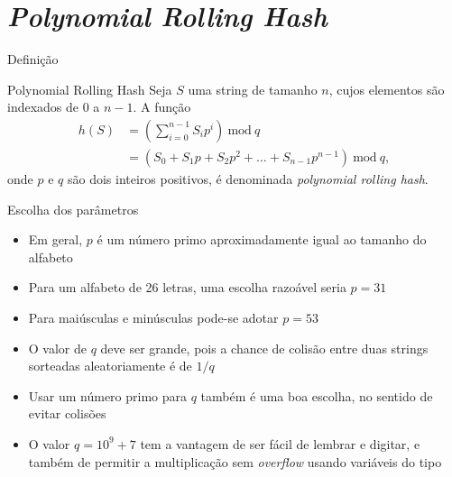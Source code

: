\section{{\it Polynomial Rolling Hash}}

\begin{frame}[fragile]{Definição}

    \begin{block}{Polynomial Rolling Hash}
    Seja $S$ uma string de tamanho $n$, cujos elementos são indexados de 0 a $n - 1$. A função 
    \begin{align*}
        h(S) &= \left(\sum_{i=0}^{n - 1} S_ip^i\right)\ \mbox{mod}\ q \\
        &= \left(S_0 + S_1p + S_2p^2 + \ldots + S_{n-1}p^{n-1}\right)\ \mbox{mod}\ q,
    \end{align*}
    onde $p$ e $q$ são dois inteiros positivos, é denominada \textit{polynomial rolling hash}.
    \end{block}

\end{frame}

\begin{frame}[fragile]{Escolha dos parâmetros}

    \begin{itemize}
        \item Em geral, $p$ é um número primo aproximadamente igual ao tamanho do alfabeto
        \item Para um alfabeto de 26 letras, uma escolha razoável seria $p = 31$
        \item Para maiúsculas e minúsculas pode-se adotar $p = 53$
        \item O valor de $q$ deve ser grande, pois a chance de colisão entre duas strings
            sorteadas aleatoriamente é de $1/q$
        \item Usar um número primo para $q$ também é uma boa escolha, no sentido de evitar 
            colisões

        \item O valor $q = 10^9 + 7$ tem a vantagem de ser fácil de lembrar e digitar, e também
            de permitir a multiplicação sem \textit{overflow} usando variáveis do tipo
    \end{itemize}

\end{frame}

